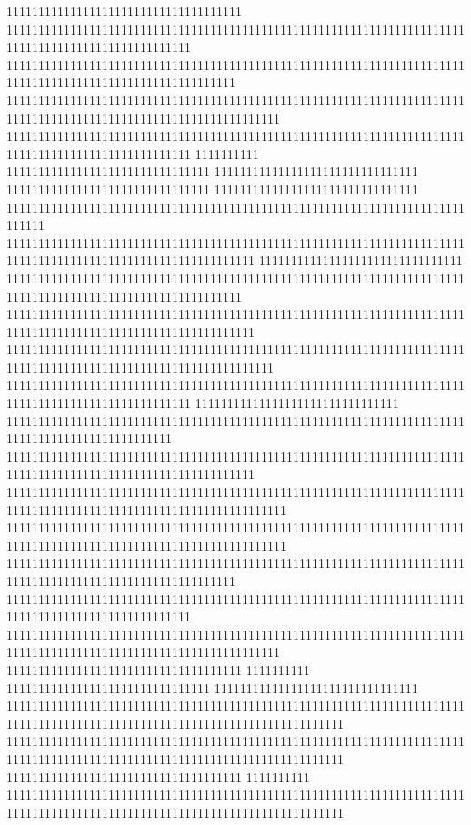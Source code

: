 1111111111111111111111111111111111111
11111111111111111111111111111111111111111111111111111111111111111111111111111111111111111111111111111
111111111111111111111111111111111111111111111111111111111111111111111111111111111111111111111111111111111111
1111111111111111111111111111111111111111111111111111111111111111111111111111111111111111111111111111111111111111111
11111111111111111111111111111111111111111111111111111111111111111111111111111111111111111111111111111
1111111111
11111111111111111111111111111111
11111111111111111111111111111111
11111111111111111111111111111111
11111111111111111111111111111111
111111111111111111111111111111111111111111111111111111111111111111111111111111
111111111111111111111111111111111111111111111111111111111111111111111111111111111111111111111111111111111111111
11111111111111111111111111111111
1111111111111111111111111111111111111111111111111111111111111111111111111111111111111111111111111111111111111
111111111111111111111111111111111111111111111111111111111111111111111111111111111111111111111111111111111111111
111111111111111111111111111111111111111111111111111111111111111111111111111111111111111111111111111111111111111111
11111111111111111111111111111111111111111111111111111111111111111111111111111111111111111111111111111
11111111111111111111111111111111
11111111111111111111111111111111111111111111111111111111111111111111111111111111111111111111111111
111111111111111111111111111111111111111111111111111111111111111111111111111111111111111111111111111111111111111
11111111111111111111111111111111111111111111111111111111111111111111111111111111111111111111111111111111111111111111
11111111111111111111111111111111111111111111111111111111111111111111111111111111111111111111111111111111111111111111
111111111111111111111111111111111111111111111111111111111111111111111111111111111111111111111111111111111111
11111111111111111111111111111111111111111111111111111111111111111111111111111111111111111111111111111
1111111111111111111111111111111111111111111111111111111111111111111111111111111111111111111111111111111111111111111
1111111111111111111111111111111111111
1111111111
11111111111111111111111111111111
11111111111111111111111111111111
11111111111111111111111111111111111111111111111111111111111111111111111111111111111111111111111111111111111111111111111111111
11111111111111111111111111111111111111111111111111111111111111111111111111111111111111111111111111111111111111111111111111111
1111111111111111111111111111111111111
1111111111
11111111111111111111111111111111111111111111111111111111111111111111111111111111111111111111111111111111111111111111111111111
